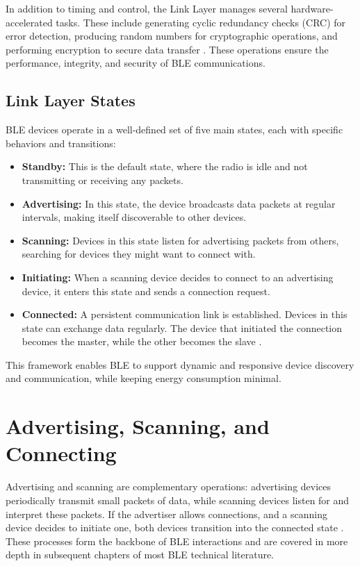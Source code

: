 In addition to timing and control, the Link Layer manages several hardware-accelerated tasks. These include generating cyclic redundancy checks (CRC) for error detection, producing random numbers for cryptographic operations, and performing encryption to secure data transfer \cite{introtoble}. These operations ensure the performance, integrity, and security of BLE communications.

\subsection{Link Layer States}

BLE devices operate in a well-defined set of five main states, each with specific behaviors and transitions:

\begin{itemize}
    \item \textbf{Standby:} This is the default state, where the radio is idle and not transmitting or receiving any packets.
    \item \textbf{Advertising:} In this state, the device broadcasts data packets at regular intervals, making itself discoverable to other devices.
    \item \textbf{Scanning:} Devices in this state listen for advertising packets from others, searching for devices they might want to connect with.
    \item \textbf{Initiating:} When a scanning device decides to connect to an advertising device, it enters this state and sends a connection request.
    \item \textbf{Connected:} A persistent communication link is established. Devices in this state can exchange data regularly. The device that initiated the connection becomes the master, while the other becomes the slave \cite{introtoble}.
\end{itemize}

This framework enables BLE to support dynamic and responsive device discovery and communication, while keeping energy consumption minimal.
\section{Advertising, Scanning, and Connecting}

Advertising and scanning are complementary operations: advertising devices periodically transmit small packets of data, while scanning devices listen for and interpret these packets. If the advertiser allows connections, and a scanning device decides to initiate one, both devices transition into the connected state \cite{introtoble}. These processes form the backbone of BLE interactions and are covered in more depth in subsequent chapters of most BLE technical literature.

